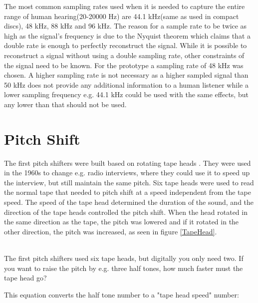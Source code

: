 The most common sampling rates used when it is needed to capture the entire range of human hearing(20-20000 Hz) are 44.1 kHz(same as used in compact discs), 48 kHz, 88 kHz and 96 kHz. The reason for a sample rate to be twice as high as the signal's frequency is due to the Nyquist theorem which claims that a double rate is enough to perfectly reconstruct the signal. While it is possible to reconstruct a signal without using a double sampling rate, other constraints of the signal need to be known. For the prototype a sampling rate of 48 kHz was chosen. A higher sampling rate is not necessary as a higher sampled signal than 50 kHz does not provide any additional information to a human listener while a lower sampling frequency e.g. 44.1 kHz could be used with the same effects, but any lower than that should not be used.

\section{Pitch Shift}

The first pitch shifters were built based on rotating tape heads \citep{Katjaas_00}. They were used in the 1960s to change e.g. radio interviews, where they could use it to speed up the interview, but still maintain the same pitch. Six tape heads were used to read the normal tape that needed to pitch shift at a speed independent from the tape speed. The speed of the tape head determined the duration of the sound, and the direction of the tape heads controlled the pitch shift. When the head rotated in the same direction as the tape, the pitch was lowered and if it rotated in the other direction, the pitch was increased, as seen in figure \ref{TapeHead}. \\

\begin{minipage}{\linewidth}%
\label{TapeHead}
\end{minipage}\\

The first pitch shifters used six tape heads, but digitally you only need two. If you want to raise the pitch by e.g. three half tones, how much faster must the tape head go?

This equation converts the half tone number to a "tape head speed" number:

